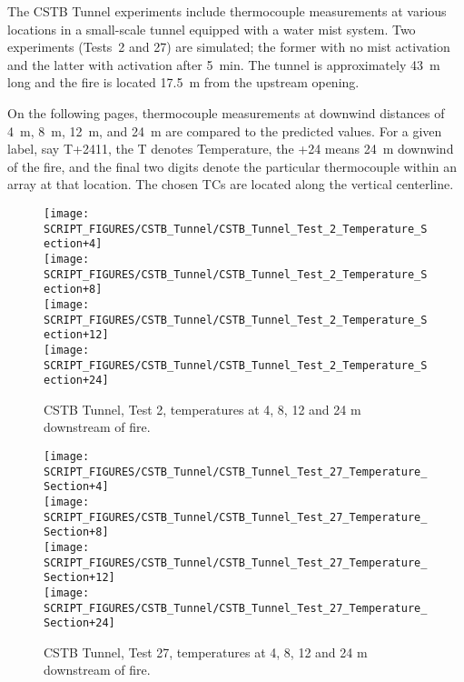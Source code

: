 The CSTB Tunnel experiments include thermocouple measurements at various locations in a small-scale tunnel equipped with a water mist system. Two experiments (Tests~2 and 27) are simulated; the former with no mist activation and the latter with activation after 5~min. The tunnel is approximately 43~m long and the fire is located 17.5~m from the upstream opening.

On the following pages, thermocouple measurements at downwind distances of 4~m, 8~m, 12~m, and 24~m are compared to the predicted values. For a given label, say T+2411, the T denotes Temperature, the +24 means 24~m downwind of the fire, and the final two digits denote the particular thermocouple within an array at that location. The chosen TCs are located along the vertical centerline.

\begin{figure}[!ht]
\centering
\texttt{[image: SCRIPT\_FIGURES/CSTB\_Tunnel/CSTB\_Tunnel\_Test\_2\_Temperature\_Section+4]}  \\
\texttt{[image: SCRIPT\_FIGURES/CSTB\_Tunnel/CSTB\_Tunnel\_Test\_2\_Temperature\_Section+8]}  \\
\texttt{[image: SCRIPT\_FIGURES/CSTB\_Tunnel/CSTB\_Tunnel\_Test\_2\_Temperature\_Section+12]} \\
\texttt{[image: SCRIPT\_FIGURES/CSTB\_Tunnel/CSTB\_Tunnel\_Test\_2\_Temperature\_Section+24]}
\caption[CSTB Tunnel, Test 2, temperatures at 4, 8, 12 and 24 m downstream of fire]
{CSTB Tunnel, Test 2, temperatures at 4, 8, 12 and 24 m downstream of fire.}
\label{CSTB_Tunnel_1}
\end{figure}

\begin{figure}[!ht]
\centering
\texttt{[image: SCRIPT\_FIGURES/CSTB\_Tunnel/CSTB\_Tunnel\_Test\_27\_Temperature\_Section+4]}  \\
\texttt{[image: SCRIPT\_FIGURES/CSTB\_Tunnel/CSTB\_Tunnel\_Test\_27\_Temperature\_Section+8]}  \\
\texttt{[image: SCRIPT\_FIGURES/CSTB\_Tunnel/CSTB\_Tunnel\_Test\_27\_Temperature\_Section+12]} \\
\texttt{[image: SCRIPT\_FIGURES/CSTB\_Tunnel/CSTB\_Tunnel\_Test\_27\_Temperature\_Section+24]}
\caption[CSTB Tunnel, Test 27, temperatures at 4, 8, 12 and 24 m downstream of fire]
{CSTB Tunnel, Test 27, temperatures at 4, 8, 12 and 24 m downstream of fire.}
\label{CSTB_Tunnel_2}
\end{figure}


